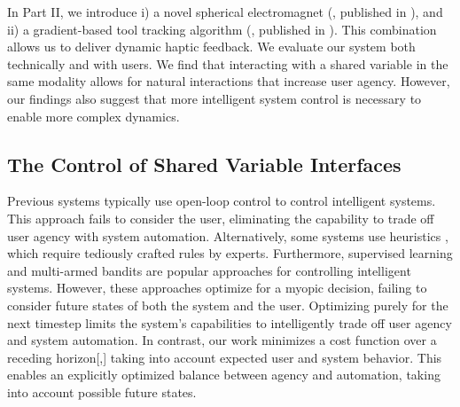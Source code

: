 In Part II, we introduce i) a novel spherical electromagnet (, published in \cite{zarate2020contact}), and ii) a gradient-based tool tracking algorithm (, published in \cite{Langerak:2020:Omni}). This combination allows us to deliver dynamic haptic feedback. We evaluate our system both technically and with users. We find that interacting with a shared variable in the same modality allows for natural interactions that increase user agency. However, our findings also suggest that more intelligent system control is necessary to enable more complex dynamics.

\subsection{The Control of Shared Variable Interfaces}
Previous systems typically use open-loop control \cite{yamaoka2013depend} to control intelligent systems. This approach fails to consider the user, eliminating the capability to trade off user agency with system automation. Alternatively, some systems use heuristics \cite{Lopes16, Browne1990, Smith2010, Stephanidis1997}, which require tediously crafted rules by experts. Furthermore, supervised learning \cite{Maes1995, Lashkari1997, McCreath2006, Faulring2010, Shen2009a, Shen2009b, Berry2011, Pejovic2014, Mehrotra2015} and multi-armed bandits \cite{glowacka2019bandit, lomas2016interface, koch2019may, kangas2022scalable, Koyama2014, Koyama2016} are popular approaches for controlling intelligent systems. However, these approaches optimize for a myopic decision, failing to consider future states of both the system and the user. Optimizing purely for the next timestep limits the system's capabilities to intelligently trade off user agency and system automation. In contrast, our work minimizes a cost function over a receding horizon[,] taking into account expected user and system behavior. This enables an explicitly optimized balance between agency and automation, taking into account possible future states.

